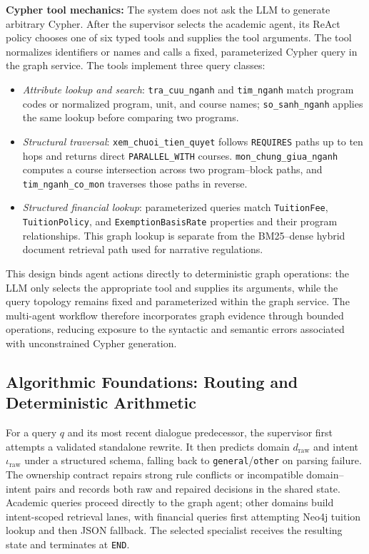 \textbf{Cypher tool mechanics:}
The system does not ask the LLM to generate arbitrary Cypher. After the supervisor selects the academic agent, its ReAct policy chooses one of six typed tools and supplies the tool arguments. The tool normalizes identifiers or names and calls a fixed, parameterized Cypher query in the graph service. The tools implement three query classes:
\begin{itemize}
    \setlength{\itemsep}{1.5pt}
    \setlength{\parsep}{0pt}
    \setlength{\parskip}{0pt}
    \item \emph{Attribute lookup and search}: \texttt{tra\_cuu\_nganh} and \texttt{tim\_nganh} match program codes or normalized program, unit, and course names; \texttt{so\_sanh\_nganh} applies the same lookup before comparing two programs.
    \item \emph{Structural traversal}: \texttt{xem\_chuoi\_tien\_quyet} follows \texttt{REQUIRES} paths up to ten hops and returns direct \texttt{PARALLEL\_WITH} courses. \texttt{mon\_chung\_giua\_nganh} computes a course intersection across two program--block paths, and \texttt{tim\_nganh\_co\_mon} traverses those paths in reverse.
    \item \emph{Structured financial lookup}: parameterized queries match \texttt{TuitionFee}, \texttt{TuitionPolicy}, and \texttt{ExemptionBasisRate} properties and their program relationships. This graph lookup is separate from the BM25--dense hybrid document retrieval path used for narrative regulations.
\end{itemize}
This design binds agent actions directly to deterministic graph operations: the LLM only selects the appropriate tool and supplies its arguments, while the query topology remains fixed and parameterized within the graph service. The multi-agent workflow therefore incorporates graph evidence through bounded operations, reducing exposure to the syntactic and semantic errors associated with unconstrained Cypher generation.

\subsection{Algorithmic Foundations: Routing and Deterministic Arithmetic}
\label{sec:algorithms}

For a query $q$ and its most recent dialogue predecessor, the supervisor first attempts a validated standalone rewrite. It then predicts domain $d_{\mathrm{raw}}$ and intent $\iota_{\mathrm{raw}}$ under a structured schema, falling back to \texttt{general}/\texttt{other} on parsing failure. The ownership contract repairs strong rule conflicts or incompatible domain--intent pairs and records both raw and repaired decisions in the shared state. Academic queries proceed directly to the graph agent; other domains build intent-scoped retrieval lanes, with financial queries first attempting Neo4j tuition lookup and then JSON fallback. The selected specialist receives the resulting state and terminates at \texttt{END}.

